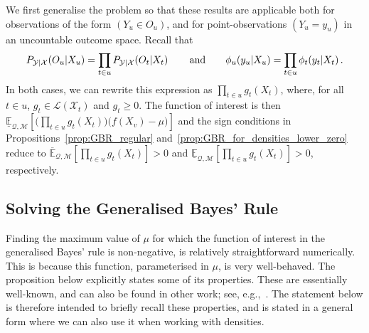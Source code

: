 \documentclass[twoside,11pt]{article}
\newcommand{\states}{\mathcal{X}}
\newcommand{\observs}{\mathcal{Y}}
\newcommand{\lexp}{\underline{\mathbb{E}}_{\rateset,\mathcal{M}}}
\newcommand{\uexp}{\overline{\mathbb{E}}_{\rateset,\mathcal{M}}}
\newcommand{\gambles}{\mathcal{L}}
\newcommand{\rateset}{\mathcal{Q}}
\begin{document}
We first generalise the problem so that these results are applicable both for observations of the form $(Y_u\in O_u)$, and for point-observations $(Y_u=y_u)$ in an uncountable outcome space. Recall that 
\begin{equation*}
P_{\observs\vert\states}(O_u\vert X_u) = \prod_{t\in u}P_{\observs\vert\states}(O_{t}\vert X_{t})\,\quad\quad\text{and}\quad\quad \phi_u(y_u\vert X_u) = \prod_{t\in u}\phi_{t}(y_{t}\vert X_{t})\,.\vspace{-5pt}
\end{equation*}
In both cases, we can rewrite this expression as $\prod_{t\in u}g_{t}(X_{t})$, where, for all $t\in u$, $g_{t}\in\gambles(\states_{t})$ and $g_{t}\geq 0$. The function of interest is then
$\lexp\left[ \bigl(\prod_{t\in u}g_{t}(X_{t})\bigr)\bigl(f(X_v) - \mu\bigr) \right]$ and the sign conditions in Propositions~\ref{prop:GBR_regular} and~\ref{prop:GBR_for_densities_lower_zero} reduce to $\uexp[\prod_{t\in u} g_{t}(X_{t})]>0$ and $\lexp[\prod_{t\in u} g_{t}(X_{t})]>0$, respectively.


\subsection{Solving the Generalised Bayes' Rule}\label{sec:gbr}

Finding the maximum value of $\mu$ for which the function of interest in the generalised Bayes' rule is non-negative, is relatively straightforward numerically. This is because this function, parameterised in $\mu$, is very well-behaved. The proposition below explicitly states some of its properties. These are essentially well-known, and can also be found in other work; see, e.g.,~\cite[Section 2.7.3]{de2015credal}. The statement below is therefore intended to briefly recall these properties, and is stated in a general form where we can also use it when working with densities.
\end{document}
